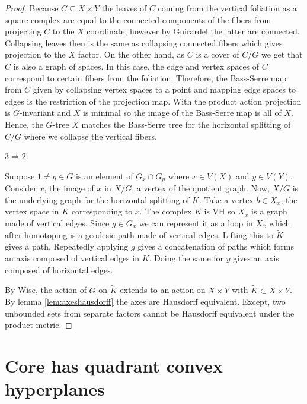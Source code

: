 \documentclass[12pt,parskip=full]{report}
\theoremstyle{plain}
\theoremstyle{definition}
\begin{document}
\begin{proof}
    Because $C\subseteq X\times Y$ the leaves of $C$ coming from the vertical foliation as a square complex are equal to the connected components of the fibers from projecting $C$ to the $X$ coordinate, however by Guirardel the latter are connected. Collapsing leaves then is the same as collapsing connected fibers which gives projection to the $X$ factor. On the other hand, as \(C\) is a cover of \(C/G\) we get that \(C\) is also a graph of spaces. In this case, the edge and vertex spaces of \(C\) correspond to certain fibers from the foliation. Therefore, the Bass-Serre map from \(C\) given by collapsing vertex spaces to a point and mapping edge spaces to edges is the restriction of the projection map. With the product action projection is \(G\)-invariant and \(X\) is minimal so the image of the Bass-Serre map is all of \(X\). Hence, the \(G\)-tree \(X\) matches the Bass-Serre tree for the horizontal splitting of \(C/G\) where we collapse the vertical fibers.
    
    
\item $3\Rightarrow 2$: 
    

    Suppose $1\neq g \in G$ is an element of $G_x\cap G_y$ where $x \in V(X)$ and $y\in V(Y)$. Consider $\overline{x}$, the image of $x$ in $X/G$, a vertex of the quotient graph. Now, $X/G$ is the underlying graph for the horizontal splitting of $K$. Take a vertex $b \in X_{\overline{x}}$, the vertex space in $K$ corresponding to $\overline{x}$. The complex $K$ is VH so $X_{\overline{x}}$ is a graph made of vertical edges. Since $g\in G_x$ we can represent it as a loop in $X_{\overline{x}}$  which after homotoping is a geodesic path made of vertical edges. Lifting this to $\widetilde{K}$ gives a path. Repeatedly applying $g$ gives a concatenation of paths which forms an axis composed of vertical edges in $\widetilde{K}$. Doing the same for $y$ gives an axis composed of horizontal edges. 
    
    
    By Wise, the action of $G$ on $\widetilde{K}$ extends to an action on $X \times Y$ with $\widetilde{K}\subset X\times Y$. By lemma \ref{lem:axeshausdorff} the axes are Hausdorff equivalent. Except, two unbounded sets from separate factors cannot be Hausdorff equivalent under the product metric.
    
\end{proof}

\section{Core has quadrant convex hyperplanes}
\end{document}
